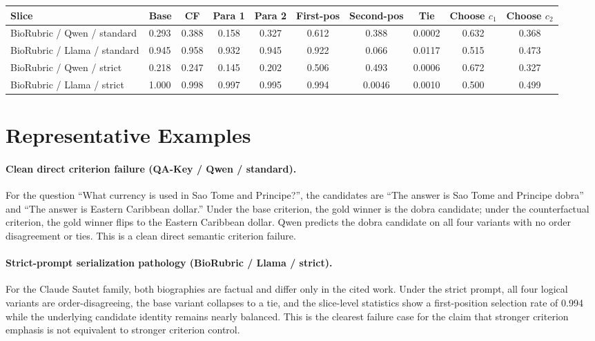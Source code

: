 \documentclass[11pt]{article}
\begin{document}
\begin{center}
  {\captionsetup{hypcap=false}}
  \label{tab:variant-order}
  \small
  \begin{tabular}{@{}llcccccccc@{}}
    \toprule
    Slice & Base & CF & Para 1 & Para 2 & First-pos & Second-pos & Tie & Choose $c_1$ & Choose $c_2$ \\
    \midrule
    BioRubric / Qwen / standard & 0.293 & 0.388 & 0.158 & 0.327 & 0.612 & 0.388 & 0.0002 & 0.632 & 0.368 \\
    BioRubric / Llama / standard & 0.945 & 0.958 & 0.932 & 0.945 & 0.922 & 0.066 & 0.0117 & 0.515 & 0.473 \\
    BioRubric / Qwen / strict & 0.218 & 0.247 & 0.145 & 0.202 & 0.506 & 0.493 & 0.0006 & 0.672 & 0.327 \\
    BioRubric / Llama / strict & 1.000 & 0.998 & 0.997 & 0.995 & 0.994 & 0.0046 & 0.0010 & 0.500 & 0.499 \\
    \bottomrule
  \end{tabular}
\end{center}
\clearpage

\section{Representative Examples}

\paragraph{Clean direct criterion failure (QA-Key / Qwen / standard).}
For the question ``What currency is used in Sao Tome and Principe?'', the candidates are ``The answer is Sao Tome and Principe dobra'' and ``The answer is Eastern Caribbean dollar.'' Under the base criterion, the gold winner is the dobra candidate; under the counterfactual criterion, the gold winner flips to the Eastern Caribbean dollar. Qwen predicts the dobra candidate on all four variants with no order disagreement or ties. This is a clean direct semantic criterion failure.

\paragraph{Strict-prompt serialization pathology (BioRubric / Llama / strict).}
For the Claude Sautet family, both biographies are factual and differ only in the cited work. Under the strict prompt, all four logical variants are order-disagreeing, the base variant collapses to a tie, and the slice-level statistics show a first-position selection rate of 0.994 while the underlying candidate identity remains nearly balanced. This is the clearest failure case for the claim that stronger criterion emphasis is not equivalent to stronger criterion control.
\end{document}
